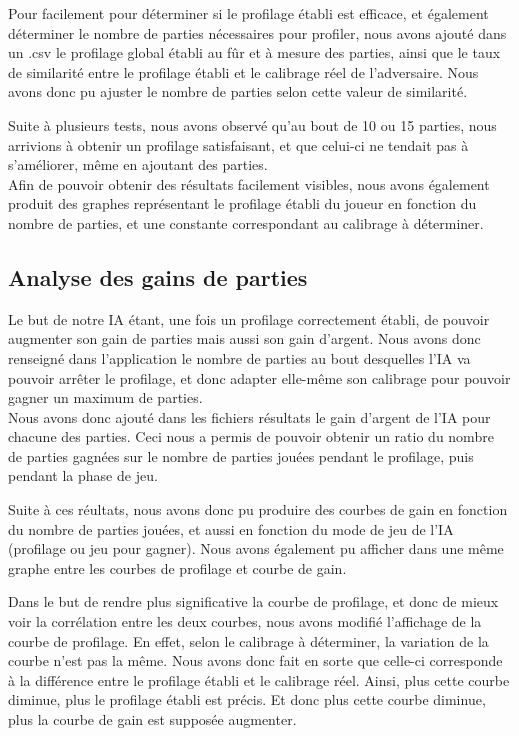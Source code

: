 \documentclass{report}
\begin{document}

\hspace{0.5cm}Pour facilement pour déterminer si le profilage établi est efficace, et également déterminer le nombre de parties nécessaires pour profiler, nous avons ajouté dans un .csv le profilage global établi au fûr et à mesure des parties, ainsi que le taux de similarité entre le profilage établi et le calibrage réel de l'adversaire. Nous avons donc pu ajuster le nombre de parties selon cette valeur de similarité.\par
Suite à plusieurs tests, nous avons observé qu'au bout de 10 ou 15 parties, nous arrivions à obtenir un profilage satisfaisant, et que celui-ci ne tendait pas à s'améliorer, même en ajoutant des parties.\\
	
\hspace{0.5cm}Afin de pouvoir obtenir des résultats facilement visibles, nous avons également produit des graphes représentant le profilage établi du joueur en fonction du nombre de parties, et une constante correspondant au calibrage à déterminer.\\

\subsection{Analyse des gains de parties}

\hspace{0.5cm}Le but de notre IA étant, une fois un profilage correctement établi, de pouvoir augmenter son gain de parties mais aussi son gain d'argent. Nous avons donc renseigné dans l'application le nombre de parties au bout desquelles l'IA va pouvoir arrêter le profilage, et donc adapter elle-même son calibrage pour pouvoir gagner un maximum de parties.\\

Nous avons donc ajouté dans les fichiers résultats le gain d'argent de l'IA pour chacune des parties. Ceci nous a permis de pouvoir obtenir un ratio du nombre de parties gagnées sur le nombre de parties jouées pendant le profilage, puis pendant la phase de jeu.\par
 
Suite à ces réultats, nous avons donc pu produire des courbes de gain en fonction du nombre de parties jouées, et aussi en fonction du mode de jeu de l'IA (profilage ou jeu pour gagner). Nous avons également pu afficher dans une même graphe entre les courbes de profilage et courbe de gain.\par
Dans le but de rendre plus significative la courbe de profilage, et donc de mieux voir la corrélation entre les deux courbes, nous avons modifié l'affichage de la courbe de profilage. En effet, selon le calibrage à déterminer, la variation de la courbe n'est pas la même. Nous avons donc fait en sorte que celle-ci corresponde à la différence entre le profilage établi et le calibrage réel. Ainsi, plus cette courbe diminue, plus le profilage établi est précis. Et donc plus cette courbe diminue, plus la courbe de gain est supposée augmenter.\\
 
\end{document}
